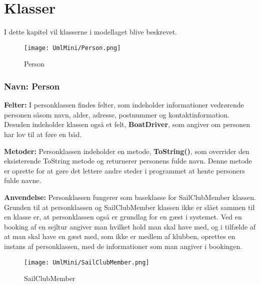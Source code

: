 \chapter{Klasser} \label{chap:klasser}

\cbstart

I dette kapitel vil klasserne i modellaget blive beskrevet.

\begin{wrapfigure}[9]{R}{0.25\textwidth}
    \label{img:Person}
    \vspace{-20pt}
    \begin{center}
        \texttt{[image: UmlMini/Person.png]}
    \end{center}
    \vspace{-10pt}
    \caption{Person}
\end{wrapfigure}
\subsection*{Navn: Person}

\textbf{Felter:}
I personklassen findes felter, som indeholder informationer vedrørende personen såsom navn, alder, adresse, postnummer og kontaktinformation. 
Desuden indeholder klassen også et felt, \textbf{BoatDriver}, som angiver om personen har lov til at føre en båd. 

\textbf{Metoder:}
Personklassen indeholder en metode, \textbf{ToString()}, som overrider den eksisterende ToString metode og returnerer personens fulde navn. 
Denne metode er oprette for at gøre det lettere andre steder i programmet at hente personers fulde navne.

\textbf{Anvendelse:}
Personklassen fungerer som baseklasse for SailClubMember klassen. Grunden til at personklassen og SailClubMember klassen ikke er slået sammen til en klasse er, at personklassen også er grundlag for en gæst i systemet. 
Ved en booking af en sejltur angiver man hvilket hold man skal have med, og i tilfælde af at man skal have en gæst med, som ikke er medlem af klubben, oprettes en instans af personklassen, med de informationer som man angiver i bookingen.

\begin{wrapfigure}[6]{R}{0.5\textwidth}
    \label{img:SailClubMember}
    \vspace{-30pt}
    \begin{center}
        \texttt{[image: UmlMini/SailClubMember.png]}
    \end{center}
    \vspace{-20pt}
    \caption{SailClubMember}
\end{wrapfigure}
